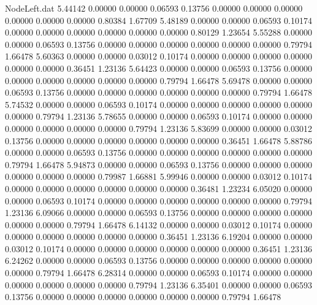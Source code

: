 \begin{filecontents}{NodeLeft.dat}
   5.44142    0.00000    0.00000     0.06593    0.13756    0.00000    0.00000    0.00000    0.00000    0.00000    0.00000    0.80384    1.67709
   5.48189    0.00000    0.00000     0.06593    0.10174    0.00000    0.00000    0.00000    0.00000    0.00000    0.00000    0.80129    1.23654
   5.55288    0.00000    0.00000     0.06593    0.13756    0.00000    0.00000    0.00000    0.00000    0.00000    0.00000    0.79794    1.66478
   5.60363    0.00000    0.00000     0.03012    0.10174    0.00000    0.00000    0.00000    0.00000    0.00000    0.00000    0.36451    1.23136
   5.64423    0.00000    0.00000     0.06593    0.13756    0.00000    0.00000    0.00000    0.00000    0.00000    0.00000    0.79794    1.66478
   5.69478    0.00000    0.00000     0.06593    0.13756    0.00000    0.00000    0.00000    0.00000    0.00000    0.00000    0.79794    1.66478
   5.74532    0.00000    0.00000     0.06593    0.10174    0.00000    0.00000    0.00000    0.00000    0.00000    0.00000    0.79794    1.23136
   5.78655    0.00000    0.00000     0.06593    0.10174    0.00000    0.00000    0.00000    0.00000    0.00000    0.00000    0.79794    1.23136
   5.83699    0.00000    0.00000     0.03012    0.13756    0.00000    0.00000    0.00000    0.00000    0.00000    0.00000    0.36451    1.66478
   5.88786    0.00000    0.00000     0.06593    0.13756    0.00000    0.00000    0.00000    0.00000    0.00000    0.00000    0.79794    1.66478
   5.94873    0.00000    0.00000     0.06593    0.13756    0.00000    0.00000    0.00000    0.00000    0.00000    0.00000    0.79987    1.66881
   5.99946    0.00000    0.00000     0.03012    0.10174    0.00000    0.00000    0.00000    0.00000    0.00000    0.00000    0.36481    1.23234
   6.05020    0.00000    0.00000     0.06593    0.10174    0.00000    0.00000    0.00000    0.00000    0.00000    0.00000    0.79794    1.23136
   6.09066    0.00000    0.00000     0.06593    0.13756    0.00000    0.00000    0.00000    0.00000    0.00000    0.00000    0.79794    1.66478
   6.14132    0.00000    0.00000     0.03012    0.10174    0.00000    0.00000    0.00000    0.00000    0.00000    0.00000    0.36451    1.23136
   6.19204    0.00000    0.00000     0.03012    0.10174    0.00000    0.00000    0.00000    0.00000    0.00000    0.00000    0.36451    1.23136
   6.24262    0.00000    0.00000     0.06593    0.13756    0.00000    0.00000    0.00000    0.00000    0.00000    0.00000    0.79794    1.66478
   6.28314    0.00000    0.00000     0.06593    0.10174    0.00000    0.00000    0.00000    0.00000    0.00000    0.00000    0.79794    1.23136
   6.35401    0.00000    0.00000     0.06593    0.13756    0.00000    0.00000    0.00000    0.00000    0.00000    0.00000    0.79794    1.66478

\end{filecontents}

